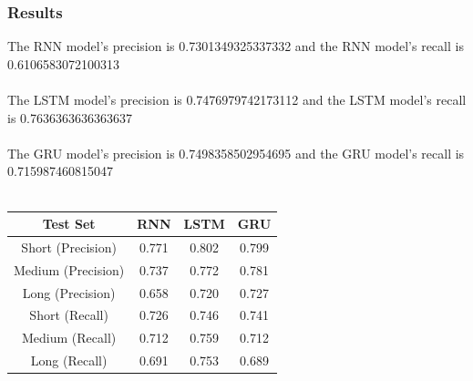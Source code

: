 \documentclass[12pt]{article}
\begin{document}
\subsubsection{Results}
The RNN model's precision is 0.7301349325337332 and the RNN model's recall is 0.6106583072100313\\
\\
The LSTM model's precision is 0.7476979742173112 and the LSTM model's recall is 0.7636363636363637\\
\\
The GRU model's precision is 0.7498358502954695 and the GRU model's recall is 0.715987460815047\\
\\
\begin{table}[h!]
\centering
\begin{tabular}{||c c c c||} 
 \hline
 Test Set & RNN & LSTM & GRU \\ [0.5ex] 
 \hline\hline
 Short (Precision) & 0.771 & 0.802 & 0.799 \\ 
 Medium (Precision) & 0.737 & 0.772 & 0.781 \\
 Long (Precision) & 0.658 & 0.720 & 0.727 \\
 Short (Recall) & 0.726 & 0.746 & 0.741 \\
 Medium (Recall) & 0.712 & 0.759 & 0.712 \\
 Long (Recall) & 0.691 & 0.753 & 0.689 \\ [1ex]
 \hline
\end{tabular}
\end{table}
\end{document}
